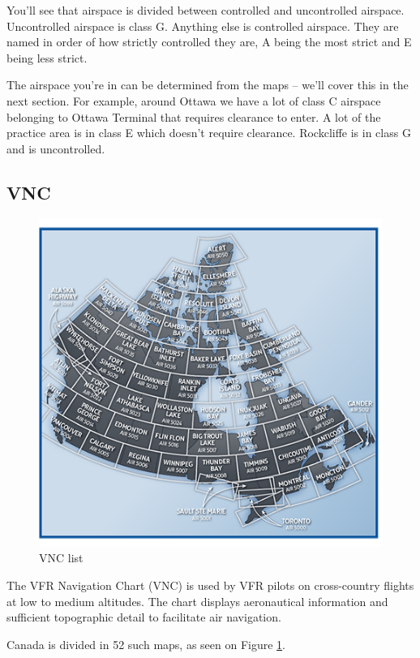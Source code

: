 \documentclass[12pt,letterpaper]{article}
\begin{document}
        You'll see that airspace is divided between controlled and uncontrolled airspace. Uncontrolled airspace is class G. Anything else is controlled airspace. They are named in order of how strictly controlled they are, A being the most strict and E being less strict.
        
        The airspace you're in can be determined from the maps -- we'll cover this in the next section. For example, around Ottawa we have a lot of class C airspace belonging to Ottawa Terminal that requires clearance to enter. A lot of the practice area is in class E which doesn't require clearance. Rockcliffe is in class G and is uncontrolled.
        
        \subsection{VNC}
        \begin{figure}
            \centering
            \includegraphics[scale=0.75]{vncs.png}
            \caption{VNC list}
            \label{fig:vnclist}
        \end{figure}

        The VFR Navigation Chart (VNC) is used by VFR pilots on cross-country flights at low to medium altitudes. The chart displays aeronautical information and sufficient topographic detail to facilitate air navigation. 

        Canada is divided in 52 such maps, as seen on Figure \ref{fig:vnclist}.
        
\end{document}
